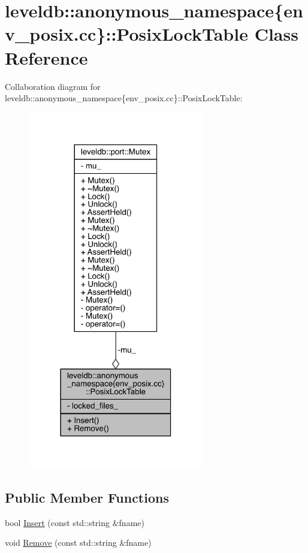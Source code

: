 \hypertarget{classleveldb_1_1anonymous__namespace_02env__posix_8cc_03_1_1_posix_lock_table}{}\section{leveldb\+:\+:anonymous\+\_\+namespace\{env\+\_\+posix.\+cc\}\+:\+:Posix\+Lock\+Table Class Reference}
\label{classleveldb_1_1anonymous__namespace_02env__posix_8cc_03_1_1_posix_lock_table}


Collaboration diagram for leveldb\+:\+:anonymous\+\_\+namespace\{env\+\_\+posix.\+cc\}\+:\+:Posix\+Lock\+Table\+:
\nopagebreak
\begin{figure}[H]
\begin{center}
\leavevmode
\includegraphics[width=218pt]{classleveldb_1_1anonymous__namespace_02env__posix_8cc_03_1_1_posix_lock_table__coll__graph}
\end{center}
\end{figure}
\subsection*{Public Member Functions}
\begin{DoxyCompactItemize}
\item 
bool \hyperlink{classleveldb_1_1anonymous__namespace_02env__posix_8cc_03_1_1_posix_lock_table_adc5e0fdccf86474e232e72272873ee85}{Insert} (const std\+::string \&fname)
\item 
void \hyperlink{classleveldb_1_1anonymous__namespace_02env__posix_8cc_03_1_1_posix_lock_table_aeaa5c7b9b2c37aa167c1a990d1d7c6b8}{Remove} (const std\+::string \&fname)
\end{DoxyCompactItemize}
